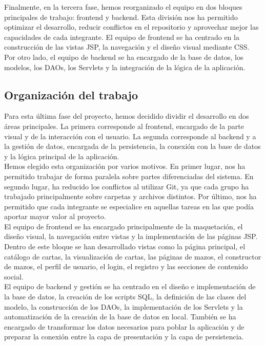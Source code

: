 \documentclass[10pt]{article}
\begin{document}
        Finalmente, en la tercera fase, hemos reorganizado el equipo en dos bloques principales de trabajo: frontend y backend. Esta división nos ha permitido optimizar el desarrollo, reducir conflictos en el repositorio y aprovechar mejor las capacidades de cada integrante. El equipo de frontend se ha centrado en la construcción de las vistas JSP, la navegación y el diseño visual mediante CSS. Por otro lado, el equipo de backend se ha encargado de la base de datos, los modelos, los DAOs, los Servlets y la integración de la lógica de la aplicación.
        
    \subsection{Organización del trabajo}
        Para esta última fase del proyecto, hemos decidido dividir el desarrollo en dos áreas principales. La primera corresponde al frontend, encargado de la parte visual y de la interacción con el usuario. La segunda corresponde al backend y a la gestión de datos, encargada de la persistencia, la conexión con la base de datos y la lógica principal de la aplicación.\\
        
        Hemos elegido esta organización por varios motivos. En primer lugar, nos ha permitido trabajar de forma paralela sobre partes diferenciadas del sistema. En segundo lugar, ha reducido los conflictos al utilizar Git, ya que cada grupo ha trabajado principalmente sobre carpetas y archivos distintos. Por último, nos ha permitido que cada integrante se especialice en aquellas tareas en las que podía aportar mayor valor al proyecto.\\
        
        El equipo de frontend se ha encargado principalmente de la maquetación, el diseño visual, la navegación entre vistas y la implementación de las páginas JSP. Dentro de este bloque se han desarrollado vistas como la página principal, el catálogo de cartas, la visualización de cartas, las páginas de mazos, el constructor de mazos, el perfil de usuario, el login, el registro y las secciones de contenido social.\\
        
        El equipo de backend y gestión se ha centrado en el diseño e implementación de la base de datos, la creación de los scripts SQL, la definición de las clases del modelo, la construcción de los DAOs, la implementación de los Servlets y la automatización de la creación de la base de datos en local. También se ha encargado de transformar los datos necesarios para poblar la aplicación y de preparar la conexión entre la capa de presentación y la capa de persistencia.
        
\end{document}
